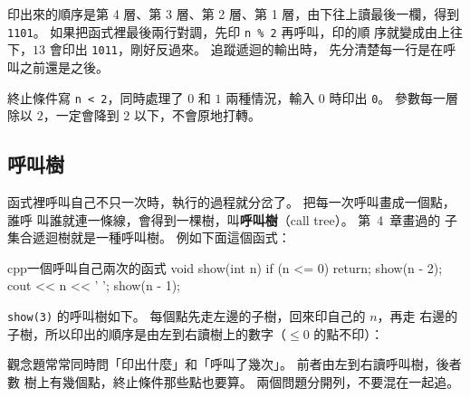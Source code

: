 印出來的順序是第 4 層、第 3 層、第 2 層、第 1 層，由下往上讀最後一欄，得到
\texttt{1101}。 如果把函式裡最後兩行對調，先印 \texttt{n \% 2} 再呼叫，印的順
序就變成由上往下，$13$ 會印出 \texttt{1011}，剛好反過來。 追蹤遞迴的輸出時，
先分清楚每一行是在呼叫之前還是之後。

終止條件寫 \texttt{n < 2}，同時處理了 $0$ 和 $1$ 兩種情況，輸入 $0$ 時印出
\texttt{0}。 參數每一層除以 $2$，一定會降到 $2$ 以下，不會原地打轉。

\subsection{呼叫樹}

函式裡呼叫自己不只一次時，執行的過程就分岔了。 把每一次呼叫畫成一個點，誰呼
叫誰就連一條線，會得到一棵樹，叫\textbf{呼叫樹}（call tree）。 第~4~章畫過的
子集合遞迴樹就是一種呼叫樹。 例如下面這個函式：

\begin{code}{cpp}{一個呼叫自己兩次的函式}
void show(int n) {
    if (n <= 0) {
        return;
    }
    show(n - 2);
    cout << n << ' ';
    show(n - 1);
}
\end{code}

\texttt{show(3)} 的呼叫樹如下。 每個點先走左邊的子樹，回來印自己的 $n$，再走
右邊的子樹，所以印出的順序是由左到右讀樹上的數字（$\le 0$ 的點不印）：

\begin{center}
\label{fig:rec-show-tree}
\end{center}

觀念題常常同時問「印出什麼」和「呼叫了幾次」。 前者由左到右讀呼叫樹，後者數
樹上有幾個點，終止條件那些點也要算。 兩個問題分開列，不要混在一起追。

